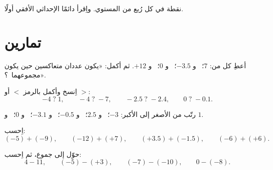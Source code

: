 \begin{omfigure}

{\small نقطة في كل رُبع من المستوي. واِقرأ دائمًا
الإحداثي الأفقي أولًا.}
\end{omfigure}

\section{تمارين}

\begin{exercise}[$\star$]\label{exo:g7:negatives:1}
أعطِ  كل من: $7$؛ \ و $-3.5$؛ \ و $0$؛ \ و $+12$. ثم أكمل:
«يكون عددان متعاكسين حين يكون مجموعهما~؟».
\end{exercise}

\begin{exercise}[$\star$]\label{exo:g7:negatives:2}
اِنسخ وأكمل بالرمز $<$ أو $>$:
\[
-4 \;?\; 1, \qquad
-4 \;?\; -7, \qquad
-2.5 \;?\; -2.4, \qquad
0 \;?\; -0.1 .
\]
\end{exercise}

\begin{exercise}[$\star$]\label{exo:g7:negatives:3}
رتّب من الأصغر إلى الأكبر: $-3$؛ \ و $2.5$؛ \ و $-0.5$؛ \ و $-3.1$؛
\ و $0$؛ \ و $1$.
\end{exercise}

\begin{exercise}[$\star$]\label{exo:g7:negatives:4}
اِحسب:
\[
(-5) + (-9), \qquad
(-12) + (+7), \qquad
(+3.5) + (-1.5), \qquad
(-6) + (+6).
\]
\end{exercise}

\begin{exercise}[$\star$]\label{exo:g7:negatives:5}
حوّل إلى جموع، ثم اِحسب:
\[
4 - 11, \qquad
(-5) - (+3), \qquad
(-7) - (-10), \qquad
0 - (-8).
\]
\end{exercise}

